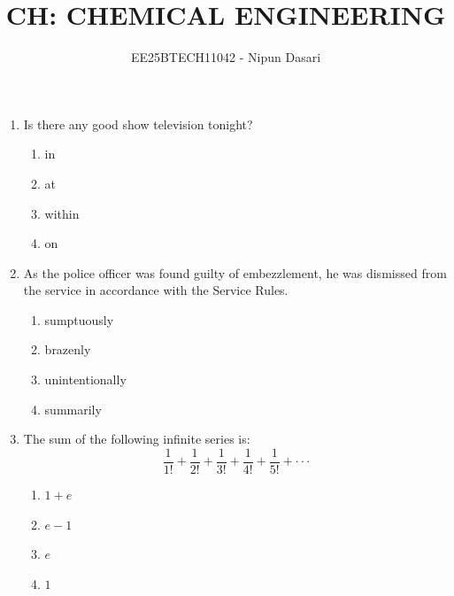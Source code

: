 \documentclass[journal,12pt,onecolumn]{IEEEtran}
\title{CH: CHEMICAL ENGINEERING}
\author{EE25BTECH11042 - Nipun Dasari}
\date{   }
\theoremstyle{remark}
\begin{document}
	
	
	\vspace{3cm}
	
	\maketitle
	\begin{enumerate}
		\item Is there any good show \underline{\hspace{2cm}} television tonight?
		
		\hfill{}
		
		\begin{multicols}{4}
			\begin{enumerate}
				\item in
				\item at
				\item within
				\item on
			\end{enumerate}
		\end{multicols}
		
		\item As the police officer was found guilty of embezzlement, he was \underline{\hspace{2cm}} dismissed from the service in accordance with the Service Rules.
		
		\hfill{}
		
		\begin{multicols}{2}
			\begin{enumerate}
				\item sumptuously
				\item brazenly
				\item unintentionally
				\item summarily
			\end{enumerate}
		\end{multicols}
		
		\item The sum of the following infinite series is:
		\[
		\frac{1}{1!} + \frac{1}{2!} + \frac{1}{3!} + \frac{1}{4!} + \frac{1}{5!} + \cdot\cdot\cdot
		\]
		
		\hfill{}
		
		\begin{multicols}{2}
			\begin{enumerate}
				\item $1+e$
				\item $e-1$
				\item $e$
				\item $1$
			\end{enumerate}
		\end{multicols}
		

\end{enumerate}
\end{document}
